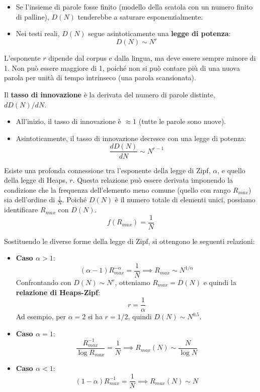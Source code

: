 \begin{itemize}
    \item Se l'insieme di parole fosse finito (modello della scatola con un numero finito di palline), $D(N)$ tenderebbe a saturare esponenzialmente.
    \item Nei testi reali, $D(N)$ segue asintoticamente una \textbf{legge di potenza}:
    \begin{equation}
    D(N) \sim N^{r}
    \end{equation}
\end{itemize}

L'esponente $r$ dipende dal corpus e dalla lingua, ma deve essere sempre minore di 1. Non può essere maggiore di 1, poiché non si può contare più di una nuova parola per unità di tempo intrinseco (una parola scansionata).


Il \textbf{tasso di innovazione} è la derivata del numero di parole distinte, $dD(N)/dN$.
\begin{itemize}
    \item All'inizio, il tasso di innovazione è $\approx 1$ (tutte le parole sono nuove).
    \item Asintoticamente, il tasso di innovazione decresce con una legge di potenza:
    \begin{equation}
    \frac{dD(N)}{dN} \sim N^{r-1}
    \end{equation}
\end{itemize}


Esiste una profonda connessione tra l'esponente della legge di Zipf, $\alpha$, e quello della legge di Heaps, $r$. Questa relazione può essere derivata imponendo la condizione che la frequenza dell'elemento meno comune (quello con rango $R_{max}$) sia dell'ordine di $\frac{1}{N}$. Poiché $D(N)$ è il numero totale di elementi unici, possiamo identificare $R_{max}$ con $D(N)$.
$$f(R_{max}) = \frac{1}{N}$$

Sostituendo le diverse forme della legge di Zipf, si ottengono le seguenti relazioni:
\begin{itemize}
    \item \textbf{Caso $\alpha > 1$}:
    $$(\alpha - 1) R_{max}^{-\alpha} = \frac{1}{N} \implies R_{max} \sim N^{1/\alpha}$$
    Confrontando con $D(N) \sim N^r$, otteniamo $R_{max} = D(N)$ e quindi la \textbf{relazione di Heaps-Zipf}:
    $$r = \frac{1}{\alpha}$$
    Ad esempio, per $\alpha=2$ si ha $r=1/2$, quindi $D(N) \sim N^{0.5}$.

    \item \textbf{Caso $\alpha = 1$}:
    $$\frac{R_{max}^{-1}}{\log R_{max}} = \frac{1}{N} \implies R_{max}(N) \sim \frac{N}{\log N}$$

    \item \textbf{Caso $\alpha < 1$}:
    $$(1-\alpha)R_{max}^{-1} = \frac{1}{N} \implies R_{max}(N) \sim N$$
\end{itemize}

